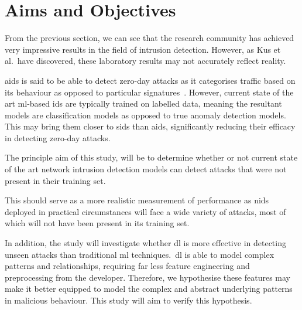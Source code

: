 \chapter{Aims and Objectives}%
\label{chp:aims}




From the previous section, we can see that the research community has achieved
very impressive results in the field of intrusion detection. However, as Kus et
al.\ have discovered, these laboratory results may not accurately reflect
reality.

\gls{aids} is said to be able to detect zero-day attacks as it categorises
traffic based on its behaviour as opposed to particular
signatures~\cite{aids-zero-day}. However, current state of the art
\gls{ml}-based \gls{ids} are typically trained on labelled data, meaning the
resultant models are classification models as opposed to true anomaly detection
models. This may bring them closer to \gls{sids} than \gls{aids}, significantly
reducing their efficacy in detecting zero-day attacks.

The principle aim of this study, will be to determine whether or not current
state of the art network intrusion detection models can detect attacks that
were not present in their training set.

This should serve as a more realistic measurement of performance as \gls{nids}
deployed in practical circumstances will face a wide variety of attacks, most
of which will not have been present in its training set.

In addition, the study will investigate whether \gls{dl} is more effective in
detecting unseen attacks than traditional \gls{ml} techniques.\ \gls{dl} is
able to model complex patterns and relationships, requiring far less feature
engineering and preprocessing from the developer. Therefore, we hypothesise
these features may make it better equipped to model the complex and abstract
underlying patterns in malicious behaviour. This study will aim to verify this
hypothesis.
